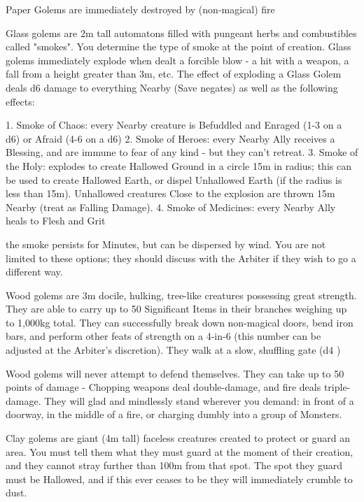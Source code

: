 {Paper Golems are immediately destroyed by (non-magical) fire


Glass golems are 2m tall automatons filled with pungeant herbs and combustibles called "smokes".  You determine the type of smoke at the point of creation. Glass golems immediately explode when dealt a forcible blow - a hit with a weapon, a fall from a height greater than 3m, etc.  The effect of exploding a Glass Golem deals d6 damage to everything Nearby (Save negates) as well as the following effects:

1. Smoke of Chaos:  every Nearby creature is Befuddled and Enraged (1-3 on a d6) or Afraid (4-6 on a d6)
2. Smoke of Heroes:  every Nearby Ally receives a Blessing, and are immune to fear of any kind - but they can't retreat.
3. Smoke of the Holy: explodes to create Hallowed Ground in a circle 15m in radius; this can be used to create Hallowed Earth, or dispel Unhallowed Earth (if the radius is less than 15m).  Unhallowed creatures Close to the explosion are thrown 15m Nearby (treat as Falling Damage).
4. Smoke of Medicines: every Nearby Ally heals to \MAX Flesh and Grit

the smoke persists for Minutes, but can be dispersed by wind.  You are not limited to these options; they should discuss with the Arbiter if they wish to go a different way.



Wood golems are 3m docile, hulking, tree-like creatures possessing great strength. They are able to carry up to 50 Significant Items in their branches weighing up to 1,000kg total.  They can successfully break down non-magical doors, bend iron bars, and perform other feats of strength on a 4-in-6 (this number can be adjusted at the Arbiter's discretion).  They walk at a slow, shuffling gate (d4 \MD)

Wood golems will never attempt to defend themselves.  They can take up to 50 points of damage - Chopping weapons deal double-damage, and fire deals triple-damage.  They will glad and mindlessly stand wherever you demand: in front of a doorway, in the middle of a fire, or charging dumbly into a group of Monsters.


Clay golems are giant (4m tall) faceless creatures created to protect or guard an area.  You must tell them what they must guard at the moment of their creation, and they cannot stray further than 100m from that spot.  The spot they guard must be Hallowed, and if this ever ceases to be they will immediately crumble to dust.

}

